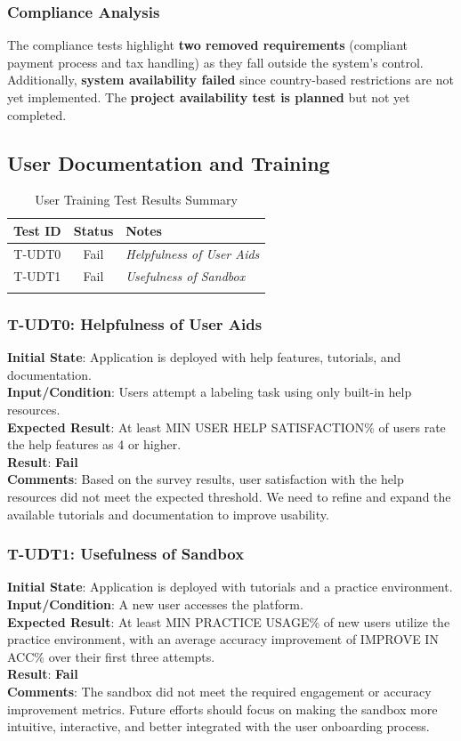 \documentclass[12pt, titlepage]{article}
\begin{document}
\subsubsection{Compliance Analysis}
The compliance tests highlight \textbf{two removed requirements} (compliant payment process and tax handling) as they fall outside the system’s control. Additionally, \textbf{system availability failed} since country-based restrictions are not yet implemented. The \textbf{project availability test is planned} but not yet completed.
\subsection{User Documentation and Training}
\begin{longtable}{|c|c|l|}
    \hline
    \textbf{Test ID} & \textbf{Status} & \textbf{Notes} \\
    \hline
    T-UDT0 & Fail & \textit{Helpfulness of User Aids} \\
    T-UDT1 & Fail & \textit{Usefulness of Sandbox} \\
    \hline
    \caption{User Training Test Results Summary}
\end{longtable}

\subsubsection{T-UDT0: Helpfulness of User Aids}
\textbf{Initial State}: Application is deployed with help features, tutorials, and documentation.\\
\textbf{Input/Condition}: Users attempt a labeling task using only built-in help resources.\\
\textbf{Expected Result}: At least MIN USER HELP SATISFACTION\% of users rate the help features as 4 or higher.\\
\textbf{Result}: \textbf{Fail}\\
\textbf{Comments}: Based on the survey results, user satisfaction with the help resources did not meet the expected threshold. We need to refine and expand the available tutorials and documentation to improve usability.

\subsubsection{T-UDT1: Usefulness of Sandbox}
\textbf{Initial State}: Application is deployed with tutorials and a practice environment.\\
\textbf{Input/Condition}: A new user accesses the platform.\\
\textbf{Expected Result}: At least MIN PRACTICE USAGE\% of new users utilize the practice environment, with an average accuracy improvement of IMPROVE IN ACC\% over their first three attempts.\\
\textbf{Result}: \textbf{Fail}\\
\textbf{Comments}: The sandbox did not meet the required engagement or accuracy improvement metrics. Future efforts should focus on making the sandbox more intuitive, interactive, and better integrated with the user onboarding process.
\end{document}
